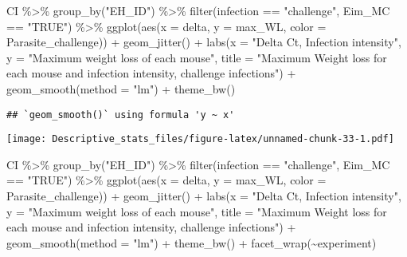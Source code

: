 \documentclass[
]{article}
\newenvironment{Shaded}{\begin{snugshade}}{\end{snugshade}}
\newcommand{\AttributeTok}[1]{\textcolor[rgb]{0.77,0.63,0.00}{#1}}
\newcommand{\FunctionTok}[1]{\textcolor[rgb]{0.00,0.00,0.00}{#1}}
\newcommand{\NormalTok}[1]{#1}
\newcommand{\SpecialCharTok}[1]{\textcolor[rgb]{0.00,0.00,0.00}{#1}}
\newcommand{\StringTok}[1]{\textcolor[rgb]{0.31,0.60,0.02}{#1}}
\begin{document}
\begin{Shaded}
\begin{Highlighting}[]
\NormalTok{CI  }\SpecialCharTok{\%\textgreater{}\%}
  \FunctionTok{group\_by}\NormalTok{(}\StringTok{"EH\_ID"}\NormalTok{) }\SpecialCharTok{\%\textgreater{}\%}
  \FunctionTok{filter}\NormalTok{(infection }\SpecialCharTok{==} \StringTok{"challenge"}\NormalTok{, Eim\_MC }\SpecialCharTok{==} \StringTok{"TRUE"}\NormalTok{) }\SpecialCharTok{\%\textgreater{}\%}
  \FunctionTok{ggplot}\NormalTok{(}\FunctionTok{aes}\NormalTok{(}\AttributeTok{x =}\NormalTok{ delta, }\AttributeTok{y =}\NormalTok{ max\_WL, }\AttributeTok{color =}\NormalTok{ Parasite\_challenge)) }\SpecialCharTok{+}
  \FunctionTok{geom\_jitter}\NormalTok{() }\SpecialCharTok{+}
  \FunctionTok{labs}\NormalTok{(}\AttributeTok{x =} \StringTok{"Delta Ct, Infection intensity"}\NormalTok{, }\AttributeTok{y =} \StringTok{"Maximum weight loss of each mouse"}\NormalTok{,}
       \AttributeTok{title =} \StringTok{"Maximum Weight loss for each mouse and infection intensity, }
\StringTok{       challenge infections"}\NormalTok{) }\SpecialCharTok{+}
    \FunctionTok{geom\_smooth}\NormalTok{(}\AttributeTok{method =} \StringTok{"lm"}\NormalTok{) }\SpecialCharTok{+}
    \FunctionTok{theme\_bw}\NormalTok{()}
\end{Highlighting}
\end{Shaded}

\begin{verbatim}
## `geom_smooth()` using formula 'y ~ x'
\end{verbatim}

\texttt{[image: Descriptive\_stats\_files/figure-latex/unnamed-chunk-33-1.pdf]}

\begin{Shaded}
\begin{Highlighting}[]
\NormalTok{CI  }\SpecialCharTok{\%\textgreater{}\%}
  \FunctionTok{group\_by}\NormalTok{(}\StringTok{"EH\_ID"}\NormalTok{) }\SpecialCharTok{\%\textgreater{}\%}
  \FunctionTok{filter}\NormalTok{(infection }\SpecialCharTok{==} \StringTok{"challenge"}\NormalTok{, Eim\_MC }\SpecialCharTok{==} \StringTok{"TRUE"}\NormalTok{) }\SpecialCharTok{\%\textgreater{}\%}
  \FunctionTok{ggplot}\NormalTok{(}\FunctionTok{aes}\NormalTok{(}\AttributeTok{x =}\NormalTok{ delta, }\AttributeTok{y =}\NormalTok{ max\_WL, }\AttributeTok{color =}\NormalTok{ Parasite\_challenge)) }\SpecialCharTok{+}
  \FunctionTok{geom\_jitter}\NormalTok{() }\SpecialCharTok{+}
  \FunctionTok{labs}\NormalTok{(}\AttributeTok{x =} \StringTok{"Delta Ct, Infection intensity"}\NormalTok{, }\AttributeTok{y =} \StringTok{"Maximum weight loss of each mouse"}\NormalTok{,}
       \AttributeTok{title =} \StringTok{"Maximum Weight loss for each mouse and infection intensity, }
\StringTok{       challenge infections"}\NormalTok{) }\SpecialCharTok{+}
    \FunctionTok{geom\_smooth}\NormalTok{(}\AttributeTok{method =} \StringTok{"lm"}\NormalTok{) }\SpecialCharTok{+}
    \FunctionTok{theme\_bw}\NormalTok{()  }\SpecialCharTok{+}
    \FunctionTok{facet\_wrap}\NormalTok{(}\SpecialCharTok{\textasciitilde{}}\NormalTok{experiment)}
\end{Highlighting}
\end{Shaded}
\end{document}

